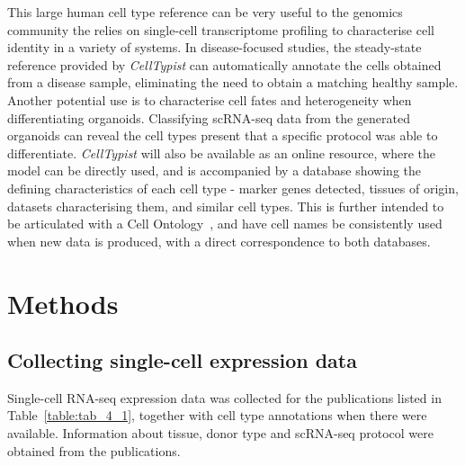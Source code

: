 

This large human cell type reference can be very useful to the genomics community the relies on single-cell transcriptome profiling to characterise cell identity in a variety of systems. In disease-focused studies, the steady-state reference provided by \textit{CellTypist} can automatically annotate the cells obtained from a disease sample, eliminating the need to obtain a matching healthy sample. Another potential use is to characterise cell fates and heterogeneity when differentiating organoids. Classifying scRNA-seq data from the generated organoids can reveal the cell types present that a specific protocol was able to differentiate. \textit{CellTypist} will also be available as an online resource, where the model can be directly used, and is accompanied by a database showing the defining characteristics of each cell type - marker genes detected, tissues of origin, datasets characterising them, and similar cell types. This is further intended to be articulated with a Cell Ontology~\citep{bard_ontology_2005}, and have cell names be consistently used when new data is produced, with a direct correspondence to both databases.







\section{Methods}
\label{section4.4}
\subsection{Collecting single-cell expression data}
\label{section4.4_datacol}
Single-cell RNA-seq expression data was collected for the publications listed in Table~\ref{table:tab_4_1}, together with cell type annotations when there were available. Information about tissue, donor type and scRNA-seq protocol were obtained from the publications.

